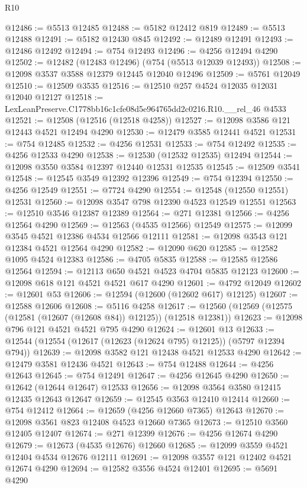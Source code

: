 \begin{lexlean}{R10}
\begin{coremodule}
@12486 := @5513 @12485
@12488 := @5182 @12412 @819
@12489 := @5513 @12488
@12491 := @5182 @12430 @845
@12492 := @12489 @12491
@12493 := @12486 @12492
@12494 := @754 @12493
@12496 := @4256 @12494 @4290
@12502 := @12482 (@12483 @12496) (@754 (@5513 @12039 @12493))
@12508 := @12098 @3537 @3588 @12379 @12445 @12040 @12496
@12509 := @5761 @12049
@12510 := @12509 @3535
@12516 := @12510 @257 @4524 @12035 @12031 @12040 @12127
@12518 := LexLeanPreserve.C1778bb16c1cfe08d5e964765dd2c0216.R10.__rel_46 @4533
@12521 := @12508 (@12516 (@12518 @4258))
@12527 := @12098 @3586 @121 @12443 @4521 @12494 @4290
@12530 := @12479 @3585 @12441 @4521
@12531 := @754 @12485
@12532 := @4256 @12531
@12533 := @754 @12492
@12535 := @4256 @12533 @4290
@12538 := @12530 (@12532 @12535) @12494
@12544 := @12098 @3550 @3584 @12397 @12440 @12531 @12535
@12545 := @12509 @3541
@12548 := @12545 @3549 @12392 @12396
@12549 := @754 @12394
@12550 := @4256 @12549
@12551 := @7724 @4290
@12554 := @12548 (@12550 @12551) @12531
@12560 := @12098 @3547 @798 @12390 @4523 @12549 @12551
@12563 := @12510 @3546 @12387 @12389
@12564 := @271 @12381
@12566 := @4256 @12564 @4290
@12569 := @12563 (@4535 @12566) @12549
@12575 := @12099 @3545 @4521 @12386 @4534 @12566 @12111
@12581 := @12098 @3543 @121 @12384 @4521 @12564 @4290
@12582 := @12090 @620
@12585 := @12582 @1095 @4524 @12383
@12586 := @4705 @5835
@12588 := @12585 @12586 @12564
@12594 := @12113 @650 @4521 @4523 @4704 @5835 @12123
@12600 := @12098 @618 @121 @4521 @4521 @617 @4290
@12601 := @4792 @12049
@12602 := @12601 @53
@12606 := @12594 (@12600 (@12602 @617) @12125)
@12607 := @12588 @12606
@12608 := @5116 @4258
@12617 := @12560 (@12569 (@12575 (@12581 (@12607 (@12608 @84)) @12125)) (@12518 @12381))
@12623 := @12098 @796 @121 @4521 @4521 @795 @4290
@12624 := @12601 @13
@12633 := @12544 (@12554 (@12617 (@12623 (@12624 @795) @12125)) (@5797 @12394 @794))
@12639 := @12098 @3582 @121 @12438 @4521 @12533 @4290
@12642 := @12479 @3581 @12436 @4521
@12643 := @754 @12488
@12644 := @4256 @12643
@12645 := @754 @12491
@12647 := @4256 @12645 @4290
@12650 := @12642 (@12644 @12647) @12533
@12656 := @12098 @3564 @3580 @12415 @12435 @12643 @12647
@12659 := @12545 @3563 @12410 @12414
@12660 := @754 @12412
@12664 := @12659 (@4256 @12660 @7365) @12643
@12670 := @12098 @3561 @823 @12408 @4523 @12660 @7365
@12673 := @12510 @3560 @12405 @12407
@12674 := @271 @12399
@12676 := @4256 @12674 @4290
@12679 := @12673 (@4535 @12676) @12660
@12685 := @12099 @3559 @4521 @12404 @4534 @12676 @12111
@12691 := @12098 @3557 @121 @12402 @4521 @12674 @4290
@12694 := @12582 @3556 @4524 @12401
@12695 := @5691 @4290

\end{coremodule}
\end{lexlean}
